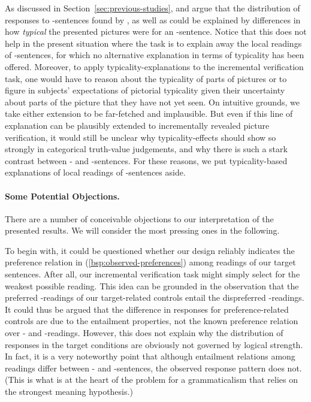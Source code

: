 \documentclass[fleqn,reqno,10pt,draft]{article}
\newcommand{\as}{\acro{as}}
\renewcommand{\es}{\acro{es}}
\newcommand{\lc}{\acro{lc}}
\newcommand{\ec}{\acro{ec}}
\begin{document}
As discussed in Section~\ref{sec:previous-studies},
\citet{Tielvan-Tiel2012:Embedded-Scalar} and
\citet{GeurtsTielvan-Tiel2013:Scalar-expressi} argue that the
distribution of responses to \as-sentences found by
\citet{CliftonDube2010:Embedded-Implic}, as well as
\citet{ChemlaSpector2010:Experimental-Ev} could be explained by
differences in how \emph{typical} the presented pictures were for an
\as-sentence. Notice that this does not help in the present situation
where the task is to explain away the local readings of \es-sentences,
for which no alternative explanation in terms of typicality has been
offered. Moreover, to apply typicality-explanations to the incremental
verification task, one would have to reason about the typicality of
parts of pictures or to figure in subjects' expectations of pictorial
typicality given their uncertainty about parts of the picture that
they have not yet seen. On intuitive grounds, we take either extension
to be far-fetched and implausible. But even if this line of
explanation can be plausibly extended to incrementally revealed
picture verification, it would still be unclear why typicality-effects
should show so strongly in categorical truth-value judgements, and why
there is such a stark contrast between \as- and \es-sentences. For
these reasons, we put typicality-based explanations of local readings
of \es-sentences aside.







\bigskip



\paragraph{Some Potential Objections.} There are a number of
conceivable objections to our interpretation of the presented
results. We will consider the most pressing ones in the following.

To begin with, it could be questioned whether our design reliably
indicates the preference relation in (\ref{bsp:observed-preferences})
among readings of our target sentences. After all, our incremental
verification task might simply select for the weakest possible
reading. This idea can be grounded in the observation that the
preferred \lc-readings of our target-related controls entail the
dispreferred \ec-readings. It could thus be argued that the difference
in responses for preference-related controls are due to the entailment
properties, not the known preference relation over \lc- and
\ec-readings. However, this does not explain why the distribution of
responses in the target conditions are obviously not governed by
logical strength. In fact, it is a very noteworthy point that although
entailment relations among readings differ between \as- and
\es-sentences, the observed response pattern does not. (This is what
is at the heart of the problem for a grammaticalism that relies on the
strongest meaning hypothesis.)
\end{document}
